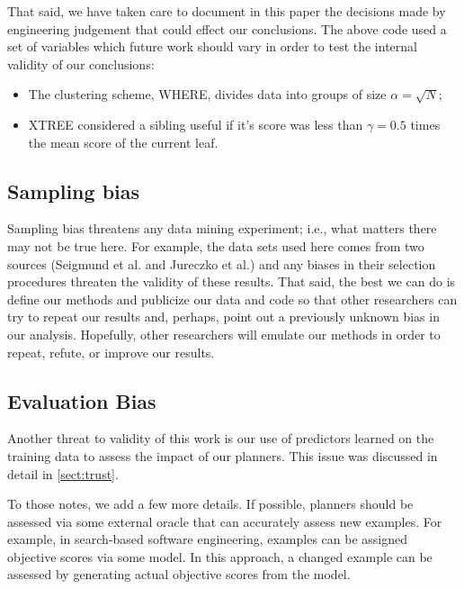 \documentclass{sig-alternate}
\newcommand{\bi}{\begin{itemize}}
\newcommand{\ei}{\end{itemize}}
\newcommand{\tion}[1]{\textsection\ref{sect:#1}}
\begin{document}
That said, we have taken care to document in this paper the decisions made by engineering
judgement that could effect our conclusions. The above code used a set of variables which future
work should vary in order to test the internal validity of our conclusions:

\bi
\item The clustering scheme, WHERE, divides data into groups of size $\alpha=\sqrt{N}$;
\item XTREE considered a sibling useful if it's score was less than $\gamma=0.5$ times the mean score of the current leaf.
 \ei

\subsection{  Sampling bias} 
Sampling bias threatens any data mining experiment; i.e., what matters
there may not be true here. For example, the data sets used here comes from two sources
(Seigmund et al. and Jureczko et al.) and any biases in their selection procedures
threaten the validity of these results. 
That said,
the best we can do is define our methods and publicize our data and code so that other researchers can
try to repeat our results and, perhaps, point out a previously unknown bias
in our analysis. Hopefully, other researchers will emulate our methods in
order to repeat, refute, or improve our results. 



\subsection{  Evaluation Bias}\label{sect:coc}
Another threat to validity of this work is our use
of predictors learned on the training data to assess the impact of our planners.
This issue was discussed in detail in \tion{trust}. 

To those notes, we add a few more details. If possible, planners should be assessed via some external oracle that can accurately assess new examples. For example, in search-based software engineering,
examples can be assigned objective scores via  some model. In this approach, a changed example can be assessed by
generating actual objective scores from the model. 


\end{document}
